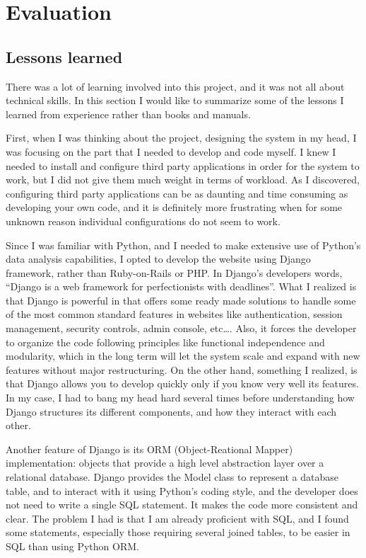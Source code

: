 \chapter{Evaluation}

\section{Lessons learned}
There was a lot of learning involved into this project, and it was not all about
technical skills. In this section I would like to summarize some of the lessons
I learned from experience rather than books and manuals.

First, when I was thinking about the project, designing the system in
my head, I was focusing on the part that I needed to develop and
code myself. I knew I needed to install and configure third party
applications in order for the system to work, but I did not give them
much weight in terms of workload. As I discovered, configuring third party
applications can be as daunting and time consuming as developing your own
code, and it is definitely more frustrating when for some unknown reason
individual configurations do not seem to work.

Since I was familiar with Python, and I needed to make extensive use of
Python's data analysis capabilities, I opted to develop the website using Django
framework, rather than Ruby-on-Rails or PHP. In Django's developers words,
``Django is a web framework for perfectionists with deadlines''.  What I
realized is that Django is powerful in that offers some ready made solutions
to handle some of the most common standard features in websites like
authentication, session management, security controls, admin console, etc\ldots.
Also, it forces the developer to organize the code following principles like
functional independence and modularity, which in the long term will let the
system scale and expand with new features without major restructuring. On the
other hand, something I realized, is that Django allows you to develop quickly
only if you know very well its features. In my case, I had to bang my head hard
several times before understanding how Django structures its different
components, and how they interact with each other.

Another feature of Django is its ORM (Object-Reational Mapper) implementation:
objects that provide a high level abstraction layer over a relational database. Django
provides the Model class to represent a database table, and to interact with it
using Python's coding style, and the developer does not need to write a
single SQL statement. It makes the code more consistent and clear. The problem I
had is that I am already proficient with SQL, and I found some statements,
especially those requiring several joined tables, to be easier in SQL than using
Python ORM.

